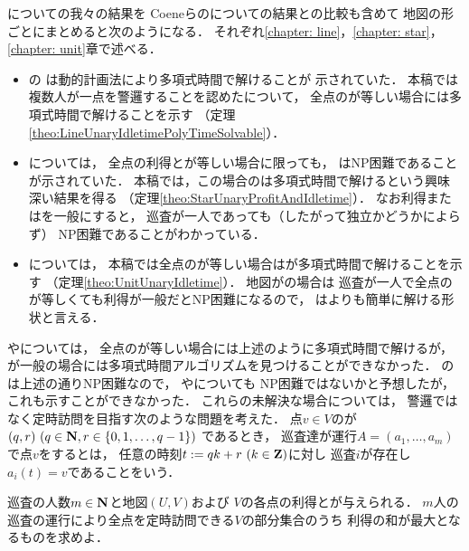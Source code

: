 {\patProb}についての我々の結果を
Coeneらの{\independentPatProb}についての結果との比較も含めて
地図の形ごとにまとめると次のようになる．
それぞれ\ref{chapter: line}，\ref{chapter: star}，\ref{chapter: unit}章で述べる．
\begin{itemize}
\item 
  {\graphLine}の
  {\independentPatProb}は動的計画法により多項式時間で解けることが
  示されていた\cite[Theorem~11]{coene2011charlemagne}．
  本稿では複数人が一点を警邏することを認めた{\patProb}について，
  全点の{\maxIdletime}が等しい場合には多項式時間で解けることを示す
  （定理\ref{theo:LineUnaryIdletimePolyTimeSolvable}）．
\item
  {\graphStar}については，
  全点の利得と{\maxIdletime}が等しい場合に限っても，
  {\independentPatProb}はNP困難であることが示されていた\cite[Theorem~10]{coene2011charlemagne}．
  本稿では，この場合の{\patProb}は多項式時間で解けるという興味深い結果を得る
  （定理\ref{theo:StarUnaryProfitAndIdletime}）．
  なお利得または{\maxIdletime}を一般にすると，
  巡査が一人であっても（したがって独立かどうかによらず）
  NP困難であることがわかっている\cite[Theorems 5 and 6]{coene2011charlemagne}．
\item 
  {\graphUnit}については，
  本稿では全点の{\maxIdletime}が等しい場合は{\patProb}が多項式時間で解けることを示す
  （定理\ref{theo:UnitUnaryIdletime}）．
  地図が{\graphStar}の場合は
  巡査が一人で全点の{\maxIdletime}が等しくても利得が一般だとNP困難になるので，
  {\graphUnit}は{\graphStar}よりも簡単に解ける形状と言える．
\end{itemize}

{\graphLine}や{\graphUnit}については，
全点の{\maxIdletime}が等しい場合には上述のように多項式時間で解けるが，
{\maxIdletime}が一般の場合には多項式時間アルゴリズムを見つけることができなかった．
{\graphStar}の{\patProb}は上述の通りNP困難なので\cite[Theorems 5 and 6]{coene2011charlemagne}，
{\graphLine}や{\graphUnit}についても
NP困難ではないかと予想したが，これも示すことができなかった．
これらの未解決な場合については，
警邏ではなく定時訪問を目指す次のような問題を考えた．
%
点$v \in V$の{\exactTime}が
$(q, r)\ (q \in \mathbf N, r \in \{ 0, 1, \ldots, q - 1 \})$%
であるとき，
巡査達が運行$A = (a _1, \ldots, a _m)$で点$v$をするとは，
任意の時刻$t := q k + r\ (k \in \mathbf Z)$に対し
巡査$i$が存在し$a _i (t) = v$であることをいう．

\begin{timeSpecifiedPatrollingProblem}
  巡査の人数$m \in \mathbf N$と地図$(U, V)$および
  $V$の各点の利得と{\exactTime}が与えられる．
  $m$人の巡査の運行により全点を定時訪問できる$V$の部分集合のうち
  利得の和が最大となるものを求めよ．
\end{timeSpecifiedPatrollingProblem}

